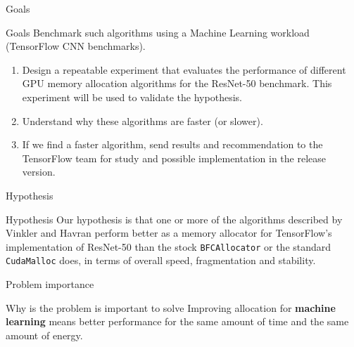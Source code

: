\documentclass[10pt]{beamer}
\begin{document}
%
%
%

\begin{frame}[fragile]{Goals}


\begin{alertblock}{Goals}
Benchmark such algorithms using a Machine Learning workload (TensorFlow CNN benchmarks).
\begin{enumerate}
    \item Design a repeatable experiment that evaluates the performance of different GPU memory allocation algorithms for the ResNet-50 benchmark. This experiment will be used to validate the hypothesis. 
    \item Understand why these algorithms are faster (or slower).
    \item If we find a faster algorithm, send results and recommendation to the TensorFlow team for study and possible implementation in the release version.
\end{enumerate}

\end{alertblock}
\end{frame}

\begin{frame}[fragile]{Hypothesis}


\begin{alertblock}{Hypothesis}
Our hypothesis is that one or more of the algorithms described by Vinkler and Havran perform better as a memory allocator for TensorFlow's implementation of ResNet-50 than the stock \texttt{BFCAllocator} or the standard \texttt{CudaMalloc} does, in terms of overall speed, fragmentation and stability.
\end{alertblock}
\end{frame}

\begin{frame}[fragile]{Problem importance}


\begin{exampleblock}{Why is the problem is important to solve}
Improving allocation for \textbf{machine learning} means better performance for the same amount of time and the same amount of energy. 
\end{exampleblock}

\end{frame}
\end{document}
